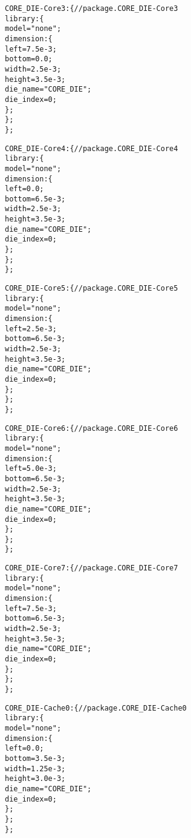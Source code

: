 {\begin{alltt}
            CORE\_DIE-Core3: \{ // package.CORE\_DIE-Core3
                library: \{
                    model = "none";
                    dimension: \{
                        left = 7.5e-3;
                        bottom = 0.0;
                        width = 2.5e-3;
                        height = 3.5e-3;
                        die_name = "CORE_DIE";
                        die_index = 0;
                    \};
                \};
            \};
            
            CORE\_DIE-Core4: \{ // package.CORE\_DIE-Core4
                library: \{
                    model = "none";
                    dimension: \{
                        left = 0.0;
                        bottom = 6.5e-3;
                        width = 2.5e-3;
                        height = 3.5e-3;
                        die_name = "CORE_DIE";
                        die_index = 0;
                    \};
                \};
            \};
            
            CORE\_DIE-Core5: \{ // package.CORE\_DIE-Core5
                library: \{
                    model = "none";
                    dimension: \{
                        left = 2.5e-3;
                        bottom = 6.5e-3;
                        width = 2.5e-3;
                        height = 3.5e-3;
                        die_name = "CORE_DIE";
                        die_index = 0;
                    \};
                \};
            \};
            
            CORE\_DIE-Core6: \{ // package.CORE\_DIE-Core6
                library: \{
                    model = "none";
                    dimension: \{
                        left = 5.0e-3;
                        bottom = 6.5e-3;
                        width = 2.5e-3;
                        height = 3.5e-3;
                        die_name = "CORE_DIE";
                        die_index = 0;
                    \};
                \};
            \};
            
            CORE\_DIE-Core7: \{ // package.CORE\_DIE-Core7
                library: \{
                    model = "none";
                    dimension: \{
                        left = 7.5e-3;
                        bottom = 6.5e-3;
                        width = 2.5e-3;
                        height = 3.5e-3;
                        die_name = "CORE_DIE";
                        die_index = 0;
                    \};
                \};
            \};
            
            CORE\_DIE-Cache0: \{ // package.CORE\_DIE-Cache0
                library: \{
                    model = "none";
                    dimension: \{
                        left = 0.0;
                        bottom = 3.5e-3;
                        width = 1.25e-3;
                        height = 3.0e-3;
                        die_name = "CORE_DIE";
                        die_index = 0;
                    \};
                \};
            \};
            

\end{alltt}}
